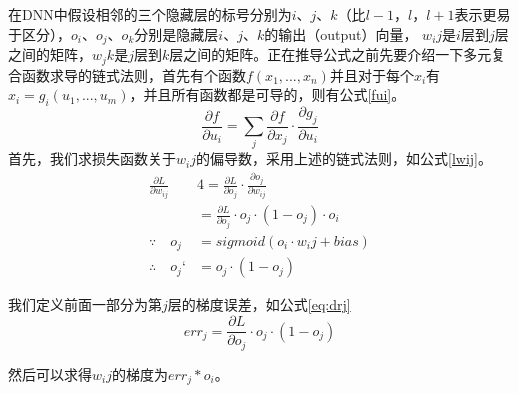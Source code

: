 在DNN中假设相邻的三个隐藏层的标号分别为$i$、$j$、$k$（比$l-1$，$l$，$l+1$表示更易于区分），$o_i$、$o_j$、$o_k$分别是隐藏层$i$、$j$、$k$的输出（output）向量， ${w_ij}$是$i$层到$j$层之间的矩阵，${w_jk}$是$j$层到$k$层之间的矩阵。正在推导公式之前先要介绍一下多元复合函数求导的链式法则，首先有个函数$f({x_1},...,{x_n})$并且对于每个$x_i$有${x_i={g_i}({u_1},...,{u_m})}$，并且所有函数都是可导的，则有公式\ref{fui}。
\begin{equation}
	\label{eq:fui}
   	\frac{{\partial f}}{{\partial {u_i}}} = \sum\limits_j {\frac{{\partial f}}{{\partial {x_j}}} \cdot \frac{{\partial {g_j}}}{{\partial {u_i}}}} 
\end{equation}
首先，我们求损失函数关于${w_ij}$的偏导数，采用上述的链式法则，如公式\ref{lwij}。
\begin{equation}
	\label{eq:lwij}
 	\begin{split}
\frac{{\partial L}}{{\partial {w_{ij}}}} &4= \frac{{\partial L}}{{\partial {o_j}}} \cdot \frac{{\partial {o_j}}}{{\partial {w_{ij}}}}\\
&= \frac{{\partial L}}{{\partial {o_j}}} \cdot {o_j} \cdot \left( {1 - {o_j}} \right) \cdot {o_i}\\
\because \quad {o_j} &= sigmoid({o_i}\cdot{w_ij} + bias)\\
\therefore \quad {o_j}‘ &= {o_j} \cdot (1-{o_j})
\end{split}
\end{equation}


我们定义前面一部分为第$j$层的梯度误差，如公式\ref{eq:drj}
\begin{equation}
	\label{eq:erj}
   	er{r_j} = \frac{{\partial L}}{{\partial {o_j}}} \cdot {o_j} \cdot \left( {1 - {o_j}} \right)
\end{equation}

然后可以求得${w_ij}$的梯度为${err_j}*{o_i}$。

